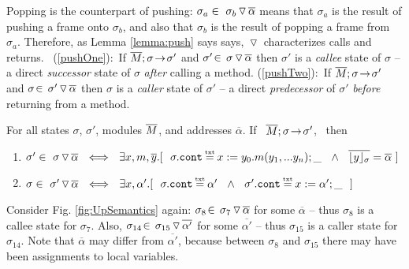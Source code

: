{Popping is the counterpart of pushing: $\sigma_a\in   \PushS  {\alpha} {\sigma_b}$ means that $\sigma_a$ is the result of pushing a frame onto $\sigma_b$, and also that  $\sigma_b$ is the result of popping a frame from $\sigma_a$.
Therefore, as  Lemma \ref{lemma:push} says says,  $\pushSymbol$ characterizes  calls and returns.}
\  (\ref{pushOne}):\  If $\leadstoOrig {\Mtwo} {\sigma}   {\sigma'} $ and $\sigma'\!\in\!\PushS   {\alpha} {\sigma}$ then $\sigma'$ is a  \emph{callee} state of $\sigma$ --  {a direct \emph{successor} state of    $\sigma$ \emph{after} calling a method}. %
 (\ref{pushTwo}):\  If $\leadstoOrig {\Mtwo} {\sigma}   {\sigma'} $ and $\sigma\! \in\! \PushS   {\alpha} {\sigma'}$  then $\sigma$ is a  \emph{caller} state  of $\sigma'$ -- {a direct \emph{predecessor} of $\sigma'$} \emph{before} returning from a method.
  
\begin{lemma}%
\label{lemma:push}
For all states $\sigma$, $\sigma'$, modules $\Mtwo$, and addresses $\overline \alpha$. If \ $\leadstoOrig {\Mtwo} {\sigma}   {\sigma'} $, \ then 
\begin{enumerate}
\item
\label{pushOne}
$\sigma'\in   \PushS  {\alpha} {\sigma}  \ \ \Longleftrightarrow \ \ 
\exists x, m, \overline{y}.[\ \ \sigma.\prg{cont} \txteq x:=y_0.m(y_1,...y_n); \_\ \ \wedge \ \
{\overline { \interpret  \sigma y}} = \overline \alpha \ ] $
\item
\label{pushTwo}
$\sigma\in   \PushS  {\alpha} {\sigma'}  \ \ \Longleftrightarrow \ \ \exists x, \alpha'.[\ \  \sigma.\prg{cont}\txteq\alpha' \ \ \wedge \ \ \sigma'.\prg{cont}\txteq x:=\alpha';\_ \ \ ] $
\end{enumerate}

\end{lemma}

 

 {Consider Fig. \ref{fig:UpSemantics} again: $\sigma_8\!\in\!   \PushS  {\alpha} {\sigma_7}$ for some $\overline \alpha$ -- {thus $\sigma_8$ is a callee state for 
 $\sigma_7$}. Also, 
 $\sigma_{14}\!\in\!\PushS  {\alpha'} {\sigma_{15}}$ for some $\overline {\alpha'}$ -- {thus $\sigma_{15}$ is a caller state for 
 $\sigma_{14}$}.
% 
Note that $\overline \alpha$ may differ from $\overline {\alpha'}$, because between $\sigma_8$ and $\sigma_{15}$ there may 
have been assignments to local variables. %
}

